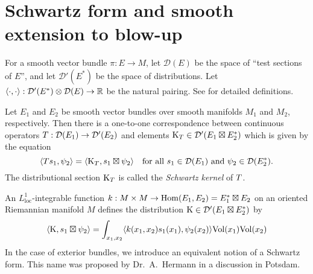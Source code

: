 \documentclass[\MainFolder/Text.tex]{subfiles}
\newcommand{\TestF}{\mathcal{D}}
\begin{document}
\section{Schwartz form and smooth extension to blow-up}\label{Sec:SchwFrom}

For a smooth vector bundle $\pi: E\rightarrow M$, let $\TestF(E)$ be the space of ``test sections of $E$'', and let $\TestF'(E^*)$ be the space of distributions.  Let $\langle\cdot,\cdot\rangle: \TestF'(E^*)\otimes\TestF(E)\rightarrow \R$ be the natural pairing. See \cite{Albin2012} for detailed definitions.
\begin{Proposition}\label{Prop:SchwKer}
Let $E_1$ and $E_2$ be smooth vector bundles over smooth manifolds $M_1$ and $M_2$, respectively. Then there is a one-to-one correspondence between continuous operators $\TOp: \TestF(E_1)\rightarrow\TestF'(E_2)$ and elements $\KKer_\TOp\in\TestF'(E_1\boxtimes E_2^*)$ which is given by the equation
$$ \langle \TOp s_1, \psi_2 \rangle = \langle \KKer_\TOp, s_1 \boxtimes \psi_2 \rangle\quad\text{for all }s_1\in \TestF(E_1)\text{ and }\psi_2\in \TestF(E_2^*). $$
The distributional section $\mathrm{K}_{T}$ is called the \emph{Schwartz kernel} of $T$. 
\end{Proposition}

An $L^1_{\text{loc}}$-integrable function $k: M\times M \rightarrow \mathrm{Hom}(E_1,E_2)=E_1^*\boxtimes E_2$ on an oriented Riemannian manifold $M$ defines the distribution $\KKer\in \TestF'(E_1\boxtimes E_2^*)$ by
$$ \langle\mathrm{K},s_1\boxtimes \psi_2\rangle = \int_{x_1, x_2} \langle k(x_1,x_2)s_1(x_1),\psi_2(x_2)\rangle \mathrm{Vol}(x_1)\mathrm{Vol}(x_2) $$
In the case of exterior bundles, we introduce an equivalent notion of a Schwartz form. This name was proposed by Dr.~A.~Hermann in a discussion in Potsdam.
\end{document}
